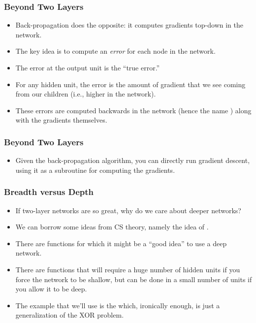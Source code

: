 \documentclass[trans]{beamer}
\begin{document}
\begin{frame}
  \frametitle{Beyond Two Layers}
\begin{itemize}
\item
Back-propagation does the
opposite: it computes gradients top-down in the network.
\item  The key idea
is to compute an \emph{error} for each node in the network.  
\item The error
at the output unit is the ``true error.''
\item   For any hidden unit, the
error is the amount of gradient that we see coming from our children
(i.e., higher in the network).
\item  These errors are computed backwards in
the network (hence the name ) along with the
gradients themselves.
\end{itemize}
\end{frame}

\begin{frame}
  \frametitle{Beyond Two Layers}
\begin{itemize}
\item
Given the back-propagation algorithm, you can directly run gradient
descent, using it as a subroutine for computing the gradients.
\end{itemize}
\end{frame}


\begin{frame}
  \frametitle{Breadth versus Depth}
\begin{itemize}
\item
If two-layer networks are so great, why do we care about
deeper networks?
\item
We can borrow some ideas from CS theory,
namely the idea of .  
\item There are functions for which it might be a ``good idea'' to use
a deep network. 
\item  There are functions that will require
a huge number of hidden units if you force the network to be shallow,
but can be done in a small number of units if you allow it to be
deep. 
\item  The example that we'll use is the 
which, ironically enough, is just a generalization of the XOR
problem.
\end{itemize}
\end{frame}
\end{document}
